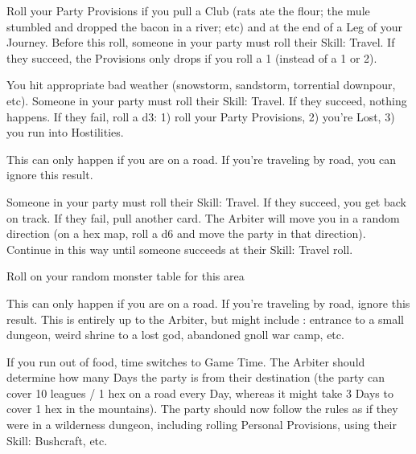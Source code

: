 {\begin{multicols}{2}
  Roll your Party Provisions if you pull a Club (rats ate the flour; the mule stumbled and dropped the bacon in a river; etc) and at the end of a Leg of your Journey.  Before this roll, someone in your party must roll their Skill: Travel.  If they succeed, the Provisions \UD only drops \DCDOWN if you roll a 1 (instead of a 1 or 2).  

  You hit appropriate bad weather (snowstorm, sandstorm, torrential downpour, etc).  Someone in your party must roll their Skill: Travel.  If they succeed, nothing happens.  If they fail, roll a d3:  1) roll your Party Provisions, 2) you're Lost, 3) you run into Hostilities.

  This can only happen if you are  on a road. If you're traveling by road, you can ignore this result.

  Someone in your party must roll their Skill: Travel.  If they succeed, you get back on track.  If they fail, pull another card. The Arbiter will move you in a random direction (on a hex map, roll a d6 and move the party in that direction). Continue in this way until someone succeeds at their Skill: Travel roll.  

  Roll on your random monster table for this area

  This can only happen if you are  on a road. If you're traveling by road, ignore this result.  This is entirely up to the Arbiter, but might include : entrance to a small dungeon, weird shrine to a lost god, abandoned gnoll war camp, etc.


  If you run out of food, time switches to Game Time.  The Arbiter should determine how many Days the party is from their destination (the party can cover 10 leagues / 1 hex on a road every Day, whereas it might take 3 Days to cover 1 hex in the mountains).  The party should now follow the rules as if they were in a wilderness dungeon, including rolling Personal Provisions, using their Skill: Bushcraft, etc. 


  \newpage




\end{multicols}}
